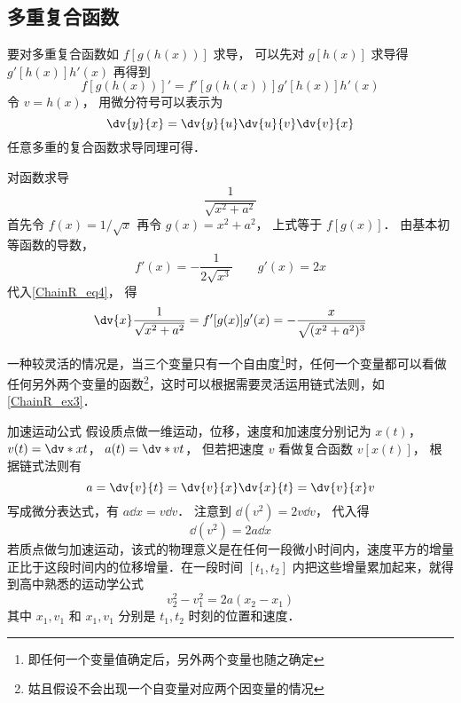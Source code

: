 \subsection{多重复合函数}
要对多重复合函数如 $f[g(h(x))]$ 求导， 可以先对 $g[h(x)]$ 求导得 $g'[h(x)]h'(x)$ 再得到
\begin{equation}
f[g(h(x))]' = f'[g(h(x))]g'[h(x)]h'(x)
\end{equation}
令 $v = h(x)$， 用微分符号可以表示为
\begin{equation}
\dv{y}{x} = \dv{y}{u}\dv{u}{v}\dv{v}{x}
\end{equation}
任意多重的复合函数求导同理可得．

\begin{example}{对函数求导}
\begin{equation}
\frac{1}{\sqrt{x^2+a^2}}
\end{equation}
首先令 $f(x) = 1/\sqrt{x}$ 再令 $g(x) = x^2+a^2$， 上式等于 $f[g(x)]$． 由基本初等函数的导数，
\begin{equation}
f'(x) = -\frac{1}{2\sqrt{x^3}}  \qquad g'(x) = 2x
\end{equation}
代入\autoref{ChainR_eq4}， 得
\begin{equation}
\dv{x} \frac{1}{\sqrt{x^2+a^2}} =  f'[g(x)] g'(x) = -\frac{x}{\sqrt{(x^2+a^2)^3}}
\end{equation}
\end{example}

一种较灵活的情况是，当三个变量只有一个自由度\footnote{即任何一个变量值确定后，另外两个变量也随之确定}时，任何一个变量都可以看做任何另外两个变量的函数\footnote{姑且假设不会出现一个自变量对应两个因变量的情况}，这时可以根据需要灵活运用链式法则，如\autoref{ChainR_ex3}．

\begin{example}{加速运动公式}\label{ChainR_ex3}
假设质点做一维运动，位移，速度和加速度分别记为 $x(t)$，  $v(t) = \dv*{x}{t}$，  $a(t) = \dv*{v}{t}$， 但若把速度 $v$ 看做复合函数 $v[x(t)]$， 根据链式法则有
\begin{equation}
a = \dv{v}{t} = \dv{v}{x}\dv{x}{t} = \dv{v}{x}v
\end{equation}
写成微分表达式，有 $a\dd{x} = v\dd{v}$． 注意到 $\dd (v^2) = 2v\dd{v}$， 代入得
\begin{equation}
\dd(v^2) = 2a \dd{x}
\end{equation}
若质点做匀加速运动，该式的物理意义是在任何一段微小时间内，速度平方的增量正比于这段时间内的位移增量．在一段时间 $[t_1,t_2]$ 内把这些增量累加起来，就得到高中熟悉的运动学公式
\begin{equation}
v_2^2-v_1^2 = 2a(x_2-x_1)
\end{equation}
其中 $x_1,v_1$ 和 $x_1,v_1$ 分别是 $t_1,t_2$ 时刻的位置和速度．
\end{example}
